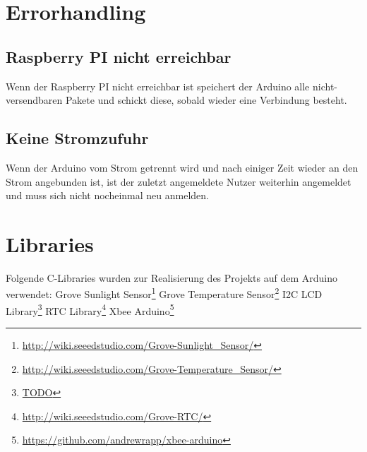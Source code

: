 \documentclass{article}
\begin{document}
\section{Errorhandling}
\subsection{Raspberry PI nicht erreichbar}
Wenn der Raspberry PI nicht erreichbar ist speichert der Arduino alle nicht-versendbaren Pakete und schickt diese, sobald wieder eine Verbindung besteht.\newline
\subsection{Keine Stromzufuhr}
Wenn der Arduino vom Strom getrennt wird und nach einiger Zeit wieder an den Strom angebunden ist, ist der zuletzt angemeldete Nutzer weiterhin angemeldet und muss sich nicht nocheinmal neu anmelden.\newline
\newpage

\section{Libraries}
Folgende C-Libraries wurden zur Realisierung des Projekts auf dem Arduino verwendet: \newline
Grove Sunlight Sensor\footnote{\label{Light}\url{http://wiki.seeedstudio.com/Grove-Sunlight_Sensor/}}\newline
Grove Temperature Sensor\footnote{\label{Temperature}\url{http://wiki.seeedstudio.com/Grove-Temperature_Sensor/}}\newline
I2C LCD Library\footnote{\label{LCD}\url{TODO}}\newline
RTC Library\footnote{\label{RTC}\url{http://wiki.seeedstudio.com/Grove-RTC/}}\newline
Xbee Arduino\footnote{\label{Xbee}\url{https://github.com/andrewrapp/xbee-arduino}}\newline
\end{document}
